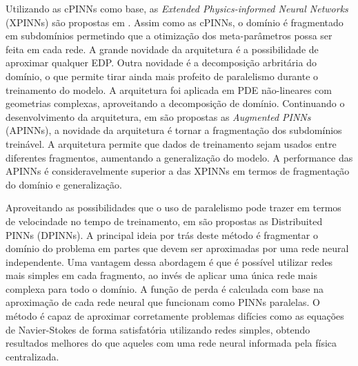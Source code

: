Utilizando as cPINNs como base, as \textit{Extended Physics-informed Neural Networks}
(XPINNs) são propostas em \cite{jagtap-etal:2020-extended-pinns}. Assim como as 
cPINNs, o domínio é fragmentado em subdomínios permetindo que a otimização dos
meta-parâmetros possa ser feita em cada rede. 
A grande novidade da arquitetura é a possibilidade de aproximar qualquer EDP.
Outra novidade é a decomposição arbritária do domínio, o que permite tirar ainda
mais profeito de paralelismo durante o treinamento do modelo.
A arquitetura foi aplicada em PDE não-lineares com geometrias complexas, 
aproveitando a decomposição de domínio.
Continuando o desenvolvimento da arquitetura, em \cite{hu-etal:2023-augmented-pinns}
são propostas as \textit{Augmented PINNs} (APINNs), a novidade da arquitetura 
é tornar a fragmentação dos subdomínios treinável.
A arquitetura permite que dados de treinamento sejam usados entre diferentes 
fragmentos, aumentando a generalização do modelo.
A performance das APINNs é consideravelmente superior a das XPINNs em termos 
de fragmentação do domínio e generalização.

Aproveitando as possibilidades que o uso de paralelismo pode trazer em termos 
de velocindade no tempo de treinamento, em \cite{dwivedi:2019-distributed-pinns}
são propostas as Distribuited PINNs (DPINNs). A principal ideia por trás deste método
é fragmentar o domínio do problema em partes que devem ser aproximadas por uma rede
neural independente. Uma vantagem dessa abordagem é que é possível utilizar redes
mais simples em cada fragmento, ao invés de aplicar uma única rede mais complexa
para todo o domínio. A função de perda é calculada com base na aproximação de cada
rede neural que funcionam como PINNs paralelas. O método é capaz de aproximar 
corretamente problemas difícies como as equações de Navier-Stokes de forma satisfatória
utilizando redes simples, obtendo resultados melhores do que aqueles com uma
rede neural informada pela física centralizada.


